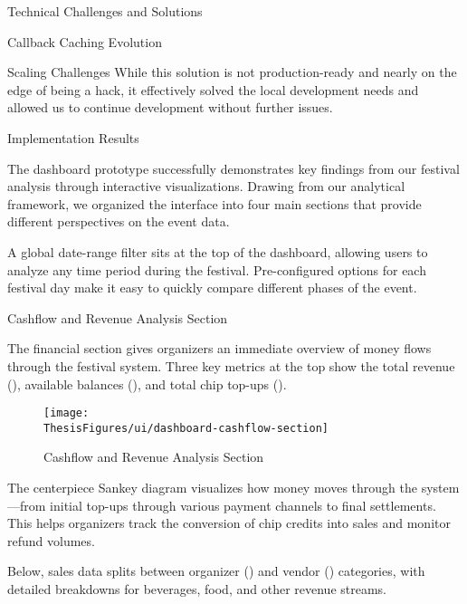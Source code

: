\begin{section}{Technical Challenges and Solutions}
\begin{subsection}{Callback Caching Evolution}
\begin{subsubsection}{Scaling Challenges}
			While this solution is not production-ready and nearly on the edge of being a hack, it effectively solved the local development needs and allowed us to continue development without further issues.
		\end{subsubsection}
	\end{subsection}
\end{section}

\begin{section}{Implementation Results}
	\label{sec:implementation-results}

	The dashboard prototype successfully demonstrates key findings from our festival analysis through interactive visualizations.
	Drawing from our analytical framework, we organized the interface into four main sections that provide different perspectives on the event data.

	A global date-range filter sits at the top of the dashboard, allowing users to analyze any time period during the festival.
	Pre-configured options for each festival day make it easy to quickly compare different phases of the event.

	\begin{subsection}{Cashflow and Revenue Analysis Section}
		\label{subsec:implementation-results-structure-cashflow}

		The financial section gives organizers an immediate overview of money flows through the festival system.
		Three key metrics at the top show the total revenue (), available balances (), and total chip top-ups ().

		\begin{figure}[H]
			\centering
			\texttt{[image: \\ThesisFigures/ui/dashboard-cashflow-section]}
			\caption{Cashflow and Revenue Analysis Section}
			\label{fig:dashboard-cashflow-analysis}
		\end{figure}

		The centerpiece Sankey diagram visualizes how money moves through the system—from initial top-ups through various payment channels to final settlements.
		This helps organizers track the conversion of chip credits into sales and monitor refund volumes.

		Below, sales data splits between organizer () and vendor () categories, with detailed breakdowns for beverages, food, and other revenue streams.
	\end{subsection}


\end{section}
